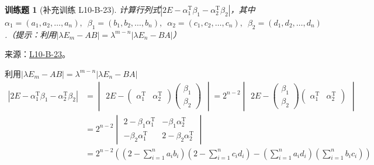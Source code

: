 \documentclass[12pt,fontset=fandol]{ctexart}
\newtheorem{exercise}{训练题}[section]
\begin{document}
\begin{exercise}[补充训练 L10-B-23]\label{prob:L10-B-23}
计算行列式$|2E-\alpha_1^\mathrm{T}\beta_1-\alpha_2^\mathrm{T}\beta_2|$，其中$\alpha_1=(a_1,a_2,\ldots,a_n),\enspace \beta_1=(b_1,b_2,\ldots,b_n),\enspace \alpha_2=(c_1,c_2,\ldots,c_n),\enspace \beta_2 = (d_1,d_2,\ldots,d_n)$.（提示：利用$|\lambda E_m-AB|=\lambda^{m-n}|\lambda E_n-BA|$）
\end{exercise}
\noindent 来源：\href{https://github.com/yhwu-is/Linear-Algebra-Left-Undone/blob/new/%E8%AE%B2%E4%B9%89/%E4%B8%93%E9%A2%98/10%20%E8%A1%8C%E5%88%97%E5%BC%8F.tex}{L10-B-23}。
\begin{solve}
利用$|\lambda E_m-AB|=\lambda^{m-n}|\lambda E_n-BA|$
            \begin{align*}
                |2E-\alpha_1^\mathrm{T}\beta_1-\alpha_2^\mathrm{T}\beta_2|
                & =\begin{vmatrix}
                        2E-\begin{pmatrix}
                        \alpha_1^\mathrm{T} & \alpha_2^\mathrm{T}
                    \end{pmatrix}\begin{pmatrix}
                                        \beta_1 \\\beta_2
                                    \end{pmatrix}
                    \end{vmatrix}
                =2^{n-2}\begin{vmatrix}
                            2E-\begin{pmatrix}
                        \beta_1 \\\beta_2
                    \end{pmatrix}\begin{pmatrix}
                                        \alpha_1^\mathrm{T} & \alpha_2^\mathrm{T}
                                    \end{pmatrix}
                        \end{vmatrix}         \\
                & =2^{n-2}\begin{vmatrix}
                            2-\beta_1\alpha_1^\mathrm{T} & -\beta_1\alpha_2^\mathrm{T}  \\
                            -\beta_2\alpha_1^\mathrm{T}  & 2-\beta_2\alpha_2^\mathrm{T}
                        \end{vmatrix} \\
                & =2^{n-2}
                \left(\left(2-\sum_{i=1}^na_ib_i\right)
                \left(2-\sum_{i=1}^nc_id_i\right)
                -\left(\sum_{i=1}^na_id_i\right)
                \left(\sum_{i=1}^nb_ic_i\right)\right)
            \end{align*}
\end{solve}
\end{document}
